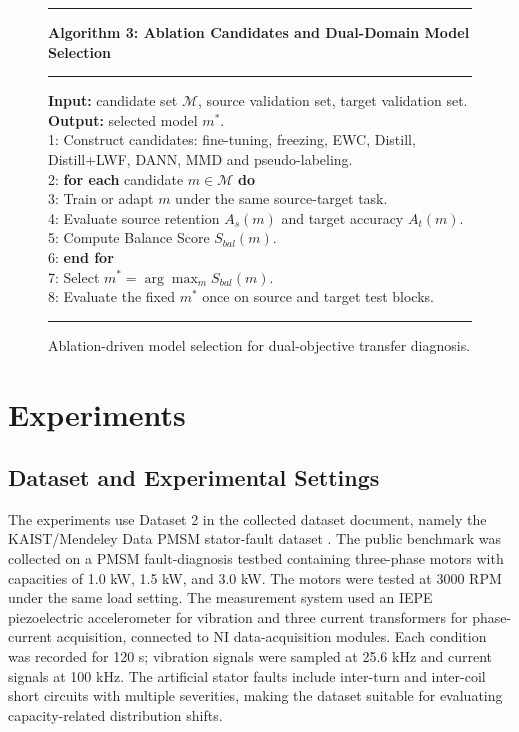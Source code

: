 \documentclass[conference,letterpaper]{IEEEtran}\IEEEoverridecommandlockouts
\newcommand{\algorule}{\noindent\rule{\linewidth}{0.6pt}}
\newenvironment{algorithmblock}[1]{%
    \begin{minipage}{0.98\linewidth}
    \algorule\vspace{2pt}
    {\small\textbf{#1}}\par\vspace{2pt}
    \algorule\vspace{2pt}
    \footnotesize
}{%
    \vspace{2pt}\algorule
    \end{minipage}
}
\begin{document}
\begin{figure}[!t]
\centering
\begin{algorithmblock}{Algorithm 3: Ablation Candidates and Dual-Domain Model Selection}
\textbf{Input:} candidate set $\mathcal{M}$, source validation set, target validation set.\\
\textbf{Output:} selected model $m^*$.\\[1mm]
1: Construct candidates: fine-tuning, freezing, EWC, Distill, Distill+LWF, DANN, MMD and pseudo-labeling.\\
2: \textbf{for each} candidate $m\in\mathcal{M}$ \textbf{do}\\
3: \quad Train or adapt $m$ under the same source-target task.\\
4: \quad Evaluate source retention $A_s(m)$ and target accuracy $A_t(m)$.\\
5: \quad Compute Balance Score $S_{bal}(m)$.\\
6: \textbf{end for}\\
7: Select $m^*=\arg\max_m S_{bal}(m)$.\\
8: Evaluate the fixed $m^*$ once on source and target test blocks.
\end{algorithmblock}
\caption{Ablation-driven model selection for dual-objective transfer diagnosis.}
\label{alg:selection}
\end{figure}

\section{Experiments}

\subsection{Dataset and Experimental Settings}
The experiments use Dataset 2 in the collected dataset document, namely the KAIST/Mendeley Data PMSM stator-fault dataset \cite{jung2023data}. The public benchmark was collected on a PMSM fault-diagnosis testbed containing three-phase motors with capacities of 1.0 kW, 1.5 kW, and 3.0 kW. The motors were tested at 3000 RPM under the same load setting. The measurement system used an IEPE piezoelectric accelerometer for vibration and three current transformers for phase-current acquisition, connected to NI data-acquisition modules. Each condition was recorded for 120 s; vibration signals were sampled at 25.6 kHz and current signals at 100 kHz. The artificial stator faults include inter-turn and inter-coil short circuits with multiple severities, making the dataset suitable for evaluating capacity-related distribution shifts.
\end{document}
